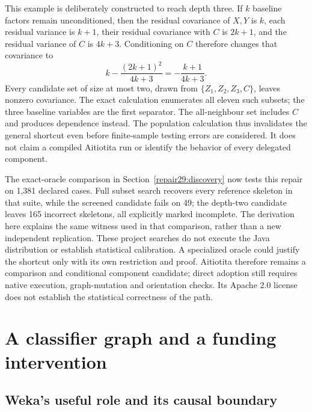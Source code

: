 This example is deliberately constructed to reach depth three. If \(k\)
baseline factors remain unconditioned, then the residual covariance of
\(X,Y\) is \(k\), each residual variance is \(k+1\), their residual
covariance with \(C\) is \(2k+1\), and the residual variance of \(C\) is
\(4k+3\). Conditioning on \(C\) therefore changes that covariance to \[
 k-\frac{(2k+1)^2}{4k+3}=-\frac{k+1}{4k+3}.
\] Every candidate set of size at most two, drawn from
\(\{Z_1,Z_2,Z_3,C\}\), leaves nonzero covariance. The exact calculation
enumerates all eleven such subsets; the three baseline variables are the
first separator. The all-neighbour set includes \(C\) and produces
dependence instead. The population calculation thus invalidates the
general shortcut even before finite-sample testing errors are
considered. It does not claim a compiled Aitiotita run or identify the
behavior of every delegated component.
\citep{exec13_java_examples,exec13_java_aitiotita}

The exact-oracle comparison in Section~\ref{repair29:discovery} now tests
this repair on 1,381 declared cases. Full subset search recovers every
reference skeleton in that suite, while the screened candidate fails on 49;
the depth-two candidate leaves 165 incorrect skeletons, all explicitly
marked incomplete. The derivation here explains the same witness used in
that comparison, rather than a new independent replication. These project
searches do not execute the Java distribution or establish statistical
calibration. A specialized oracle could justify the shortcut only with its
own restriction and proof. Aitiotita therefore remains a comparison and
conditional component candidate; direct adoption still requires native
execution, graph-mutation and orientation checks. Its Apache 2.0 license
does not establish the statistical correctness of the path.
\citep{exec13_java_aitiotita}

\hypertarget{a-classifier-graph-and-a-funding-intervention}{%
\section{A classifier graph and a funding
intervention}\label{a-classifier-graph-and-a-funding-intervention}}

\hypertarget{wekas-useful-role-and-its-causal-boundary}{%
\subsection{Weka's useful role and its causal
boundary}\label{wekas-useful-role-and-its-causal-boundary}}

